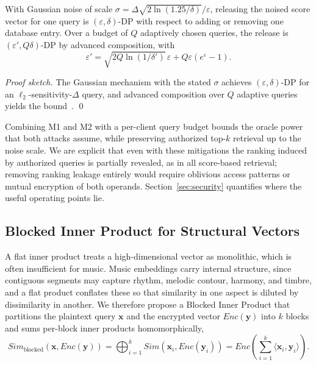 \documentclass[sigconf,nonacm]{acmart}
\begin{document}
\begin{proposition}
\label{prop:dp}
With Gaussian noise of scale $\sigma=\Delta\sqrt{2\ln(1.25/\delta)}/\varepsilon$, releasing the noised score vector for one query is $(\varepsilon,\delta)$-DP with respect to adding or removing one database entry. Over a budget of $Q$ adaptively chosen queries, the release is $(\varepsilon',Q\delta)$-DP by advanced composition, with
\[
\varepsilon'=\sqrt{2Q\ln(1/\delta')}\,\varepsilon+Q\varepsilon(e^{\varepsilon}-1).
\]
\end{proposition}
\noindent\emph{Proof sketch.} The Gaussian mechanism with the stated $\sigma$ achieves $(\varepsilon,\delta)$-DP for an $\ell_2$-sensitivity-$\Delta$ query, and advanced composition over $Q$ adaptive queries yields the bound~\cite{dwork2014algorithmic,dwork2010composition}. \qed

Combining M1 and M2 with a per-client query budget bounds the oracle power that both attacks assume, while preserving authorized top-$k$ retrieval up to the noise scale. We are explicit that even with these mitigations the ranking induced by authorized queries is partially revealed, as in all score-based retrieval; removing ranking leakage entirely would require oblivious access patterns or mutual encryption of both operands. Section~\ref{sec:security} quantifies where the useful operating points lie.

\subsection{Blocked Inner Product for Structural Vectors}
\label{subsec:blocked}
A flat inner product treats a high-dimensional vector as monolithic, which is often insufficient for music. Music embeddings carry internal structure, since contiguous segments may capture rhythm, melodic contour, harmony, and timbre, and a flat product conflates these so that similarity in one aspect is diluted by dissimilarity in another. We therefore propose a Blocked Inner Product that partitions the plaintext query $\mathbf{x}$ and the encrypted vector $Enc(\mathbf{y})$ into $k$ blocks and sums per-block inner products homomorphically,
\begin{equation}
Sim_{\text{blocked}}(\mathbf{x},Enc(\mathbf{y}))=\bigoplus_{i=1}^{k} Sim(\mathbf{x}_i,Enc(\mathbf{y}_i))=Enc\!\left(\sum_{i=1}^{k}\langle\mathbf{x}_i,\mathbf{y}_i\rangle\right).
\label{eq:blocked}
\end{equation}
\end{document}
